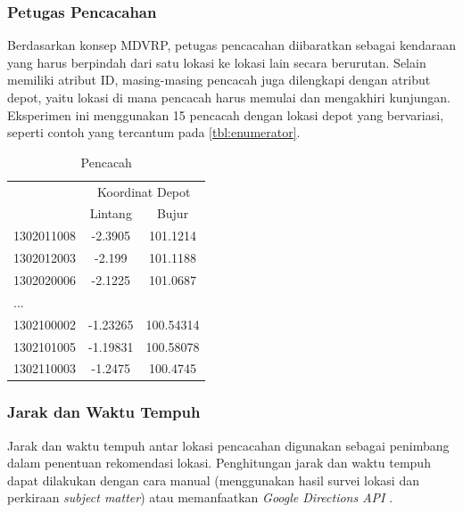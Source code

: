 \subsubsection{Petugas Pencacahan}
Berdasarkan konsep MDVRP, petugas pencacahan diibaratkan sebagai kendaraan yang harus berpindah dari satu lokasi ke lokasi lain secara berurutan. Selain memiliki atribut ID, masing-masing pencacah juga dilengkapi dengan atribut depot, yaitu lokasi di mana pencacah harus memulai dan mengakhiri kunjungan. Eksperimen ini menggunakan 15 pencacah dengan lokasi depot yang bervariasi, seperti contoh yang tercantum pada \autoref{tbl:enumerator}.


\begin{table}[!]
	\centering
	\captionsetup{format=hang}
	\caption{Pencacah}
	\label{tbl:enumerator}
	\begin{tabular}{lcc}
		\toprule
		& \multicolumn{2}{c}{Koordinat Depot}\\
		\cmidrule{2-3}
		& Lintang & Bujur\\ 
		\midrule
		1302011008 & -2.3905 & 101.1214\\
		1302012003 & -2.199 & 101.1188\\
		1302020006 & -2.1225 & 101.0687\\
		...\\
		1302100002 & -1.23265 & 100.54314\\
		1302101005 & -1.19831 & 100.58078\\
		1302110003 & -1.2475 & 100.4745\\
		\bottomrule
	\end{tabular}
\end{table}


\subsubsection{Jarak dan Waktu Tempuh}
\label{ss:distance-duration-matrix}
Jarak dan waktu tempuh antar lokasi pencacahan digunakan sebagai penimbang dalam penentuan rekomendasi lokasi. Penghitungan jarak dan waktu tempuh dapat dilakukan dengan cara manual (menggunakan hasil survei lokasi dan perkiraan \textit{subject matter}) atau memanfaatkan \textit{Google Directions API} \citep{google_google_2016}. 


